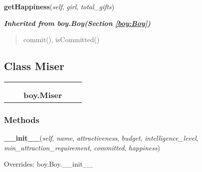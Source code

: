 \hspace{.8\funcindent}\begin{boxedminipage}{\funcwidth}

    \raggedright \textbf{getHappiness}(\textit{self}, \textit{girl}, \textit{total\_gifts})

\setlength{\parskip}{2ex}
\setlength{\parskip}{1ex}
    \end{boxedminipage}


\large{\textbf{\textit{Inherited from boy.Boy\textit{(Section \ref{boy:Boy})}}}}

\begin{quote}
commit(), isCommitted()
\end{quote}


\subsection{Class Miser}

    \label{boy:Miser}
\begin{tabular}{cccccc}
\multicolumn{2}{r}{\settowidth{\BCL}{boy.Boy}\multirow{2}{\BCL}{boy.Boy}}
&&
  \\\cline{3-3}
  &&\multicolumn{1}{c|}{}
&&
  \\
&&\multicolumn{2}{l}{\textbf{boy.Miser}}
\end{tabular}



  \subsubsection{Methods}

    \vspace{0.5ex}

\hspace{.8\funcindent}\begin{boxedminipage}{\funcwidth}

    \raggedright \textbf{\_\_init\_\_}(\textit{self}, \textit{name}, \textit{attractiveness}, \textit{budget}, \textit{intelligence\_level}, \textit{min\_attraction\_requirement}, \textit{committed}, \textit{happiness})

\setlength{\parskip}{2ex}
\setlength{\parskip}{1ex}
      Overrides: boy.Boy.\_\_init\_\_

    \end{boxedminipage}

